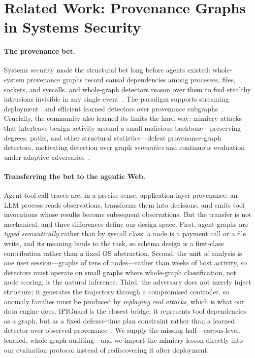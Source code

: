 \section{Related Work: Provenance Graphs in Systems Security}
\label{sec:related-prov}

\paragraph{The provenance bet.} Systems security made the structural bet long before agents existed: whole-system provenance graphs record causal dependencies among processes, files, sockets, and syscalls, and whole-graph detectors reason over them to find stealthy intrusions invisible in any single event~\cite{zipperle2022provenancebased}. The paradigm supports streaming deployment~\cite{goyal2024orchid} and efficient learned detectors over provenance subgraphs~\cite{xu2024procsage}. Crucially, the community also learned its limits the hard way: mimicry attacks that interleave benign activity around a small malicious backbone---preserving degrees, paths, and other structural statistics---defeat provenance-graph detectors, motivating detection over graph \emph{semantics} and continuous evaluation under adaptive adversaries~\cite{goyal2023sometimes}.

\paragraph{Transferring the bet to the agentic Web.} Agent tool-call traces are, in a precise sense, application-layer provenance: an LLM process reads observations, transforms them into decisions, and emits tool invocations whose results become subsequent observations. But the transfer is not mechanical, and three differences define our design space. First, agent graphs are \emph{typed semantically} rather than by syscall class: a node is a payment call or a file write, and its meaning binds to the task, so schema design is a first-class contribution rather than a fixed OS abstraction. Second, the unit of analysis is one user session---graphs of tens of nodes---rather than weeks of host activity, so detectors must operate on small graphs where whole-graph classification, not node scoring, is the natural inference. Third, the adversary does not merely inject structure; it generates the trajectory through a compromised controller, so anomaly families must be produced by \emph{replaying real attacks}, which is what our data engine does. IPIGuard is the closest bridge: it represents tool dependencies as a graph, but as a fixed defense-time plan constraint rather than a learned detector over observed provenance~\cite{an2025ipiguard}. We supply the missing half---corpus-level, learned, whole-graph auditing---and we import the mimicry lesson directly into our evaluation protocol instead of rediscovering it after deployment.
